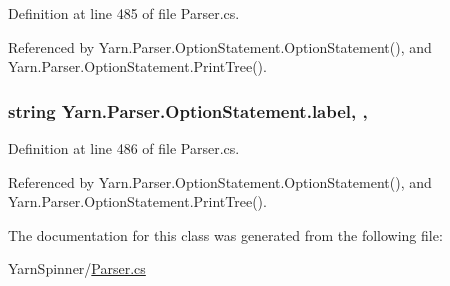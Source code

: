 Definition at line 485 of file Parser.\-cs.



Referenced by Yarn.\-Parser.\-Option\-Statement.\-Option\-Statement(), and Yarn.\-Parser.\-Option\-Statement.\-Print\-Tree().

\hypertarget{a00136_a7f27d78e67fed6992767e995e70fc468}{
\subsubsection[{label}]{\setlength{\rightskip}{0pt plus 5cm}string Yarn.\-Parser.\-Option\-Statement.\-label\hspace{0.3cm}{\ttfamily [get]}, {\ttfamily [set]}, {\ttfamily [package]}}}\label{a00136_a7f27d78e67fed6992767e995e70fc468}


Definition at line 486 of file Parser.\-cs.



Referenced by Yarn.\-Parser.\-Option\-Statement.\-Option\-Statement(), and Yarn.\-Parser.\-Option\-Statement.\-Print\-Tree().



The documentation for this class was generated from the following file\-:\begin{DoxyCompactItemize}
\item 
Yarn\-Spinner/\hyperlink{a00295}{Parser.\-cs}\end{DoxyCompactItemize}
